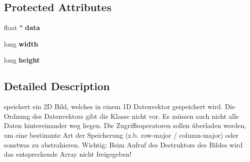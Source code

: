 \subsection*{Protected Attributes}
\begin{DoxyCompactItemize}
\item 
\hypertarget{classfloat__image_a43df6eebb483b16921cee23e80f61f5b}{float $\ast$ {\bfseries data}}\label{classfloat__image_a43df6eebb483b16921cee23e80f61f5b}

\item 
\hypertarget{classfloat__image_a92e539199f8cfa3c8ece64e2bdca54c7}{long {\bfseries width}}\label{classfloat__image_a92e539199f8cfa3c8ece64e2bdca54c7}

\item 
\hypertarget{classfloat__image_af7c859a1a77e6886adff0fd47976d069}{long {\bfseries height}}\label{classfloat__image_af7c859a1a77e6886adff0fd47976d069}

\end{DoxyCompactItemize}


\subsection{Detailed Description}
speichert ein 2\-D Bild, welches in einem 1\-D Datenvektor gespeichert wird. Die Ordnung des Datenvektors gibt die Klasse nicht vor. Es müssen auch nicht alle Daten hintereinander weg liegen. Die Zugriffsoperatoren sollen überladen werden, um eine bestimmte Art der Speicherung (z.\-b. row-\/major / column-\/major) oder sonstwas zu abstrahieren. Wichtig\-: Beim Aufruf des Destruktors des Bildes wird das entsprechende Array nicht freigegeben! 

